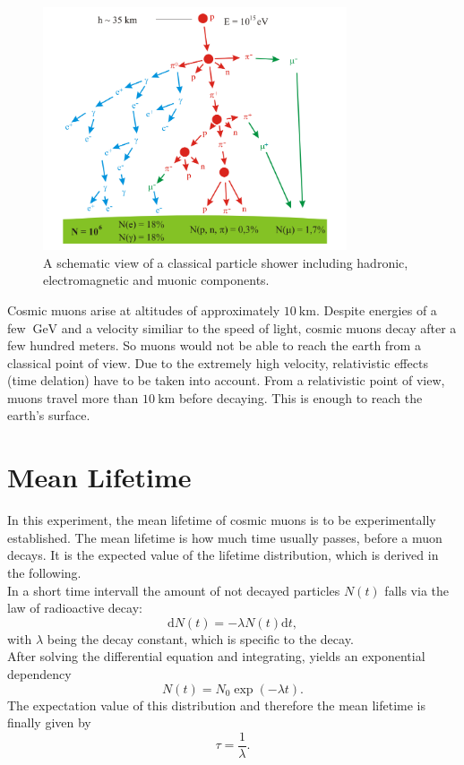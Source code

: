 \begin{figure}
    \centering
    \includegraphics[width = 0.8\textwidth]{pics/Teilchenkaskade.png}
    \caption{A schematic view of a classical particle shower including hadronic, electromagnetic and muonic components. \cite{WikiKaskade}}
    \label{fig:Teilchenshower}
\end{figure}
Cosmic muons arise at altitudes of approximately $\qty{10}{\kilo\meter}$\cite{MyonenAachen}. Despite energies of a few $\qty{}{\giga\electronvolt}$ and a velocity similiar to the speed of light, cosmic 
muons decay after a few hundred meters. So muons would not be able to reach the earth from a classical point of view. Due to the extremely high velocity, relativistic effects (time delation) have to be taken into account.
From a relativistic point of view, muons travel more than $\qty{10}{\kilo\meter}$ before decaying. This is enough to reach the earth's surface.\\

\section{Mean Lifetime}
In this experiment, the mean lifetime of cosmic muons is to be experimentally established. The mean lifetime is how much time usually passes, before a muon decays. It is the expected value of the 
lifetime distribution, which is derived in the following.\\
In a short time intervall the amount of not decayed particles $N(t)$ falls via the law of radioactive decay:
\begin{equation}
    \mathrm{d}N(t) = - \lambda N(t) \mathrm{d}t,
\end{equation}
with $\lambda$ being the decay constant, which is specific to the decay.\\
After solving the differential equation and integrating, yields an exponential dependency
\begin{equation}
    N(t) = N_0 \exp{(-\lambda t)}.
\end{equation}
The expectation value of this distribution and therefore the mean lifetime is finally given by
\begin{equation}
    \tau = \frac{1}{\lambda}.
\end{equation}


